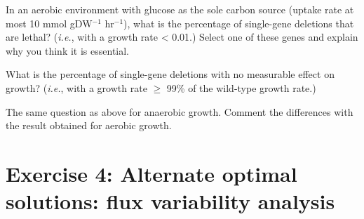 \begin{questions}
\setcounter{question}{1}
\question In an aerobic environment with glucose as the sole carbon source (uptake rate at most 10 mmol gDW$^{-1}$ hr$^{-1}$), what is the percentage of single-gene deletions that are lethal? (\textit{i.e.}, with a growth rate < 0.01.)
Select one of these genes and explain why you think it is essential.
\begin{solutionorbox}[2cm]

\end{solutionorbox}

\question What is the percentage of single-gene deletions with no measurable effect on growth? (\textit{i.e.}, with a growth rate $\ge$ 99\% of the wild-type growth rate.)
\begin{solutionorbox}[2cm]

\end{solutionorbox}

\question The same question as above for anaerobic growth. Comment the differences with the result obtained for aerobic growth.
\begin{solutionorbox}[5cm]

\end{solutionorbox}

\end{questions}

\section*{Exercise 4: Alternate optimal solutions: flux variability analysis}
\setcounter{section}{4}

